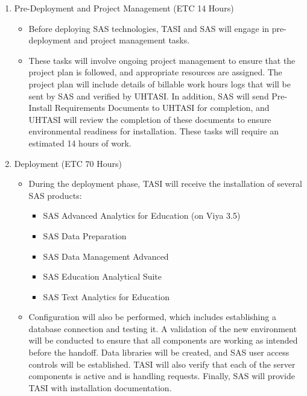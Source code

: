 \begin{enumerate} 
    \item Pre-Deployment and Project Management (ETC 14 Hours)
    \begin{itemize}
        \item Before deploying SAS technologies, TASI and SAS will engage in pre-deployment and project management tasks. 
        \item These tasks will involve ongoing project management to ensure that the project plan is followed, and appropriate resources are assigned. The project plan will include details of billable work hours logs that will be sent by SAS and verified by UHTASI. In addition, SAS will send Pre-Install Requirements Documents to UHTASI for completion, and UHTASI will review the completion of these documents to ensure environmental readiness for installation. These tasks will require an estimated 14 hours of work.
    \end{itemize}
    \item Deployment (ETC 70 Hours)
    \begin{itemize}
        \item During the deployment phase, TASI will receive the installation of several SAS products:
        \begin{itemize}
            \item SAS Advanced Analytics for Education (on Viya 3.5)
            \item SAS Data Preparation
            \item SAS Data Management Advanced
            \item SAS Education Analytical Suite
            \item SAS Text Analytics for Education
        \end{itemize}
        
        \item Configuration will also be performed, which includes establishing a database connection and testing it. A validation of the new environment will be conducted to ensure that all components are working as intended before the handoff. Data libraries will be created, and SAS user access controls will be established. TASI will also verify that each of the server components is active and is handling requests. Finally, SAS will provide TASI with installation documentation.
    \end{itemize}
\end{enumerate}
